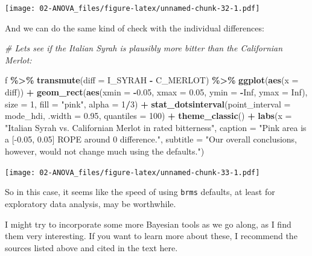 \documentclass[
]{book}
\newenvironment{Shaded}{\begin{snugshade}}{\end{snugshade}}
\newcommand{\AttributeTok}[1]{\textcolor[rgb]{0.13,0.29,0.53}{#1}}
\newcommand{\CommentTok}[1]{\textcolor[rgb]{0.56,0.35,0.01}{\textit{#1}}}
\newcommand{\ConstantTok}[1]{\textcolor[rgb]{0.56,0.35,0.01}{#1}}
\newcommand{\DecValTok}[1]{\textcolor[rgb]{0.00,0.00,0.81}{#1}}
\newcommand{\FloatTok}[1]{\textcolor[rgb]{0.00,0.00,0.81}{#1}}
\newcommand{\FunctionTok}[1]{\textcolor[rgb]{0.13,0.29,0.53}{\textbf{#1}}}
\newcommand{\NormalTok}[1]{#1}
\newcommand{\SpecialCharTok}[1]{\textcolor[rgb]{0.81,0.36,0.00}{\textbf{#1}}}
\newcommand{\StringTok}[1]{\textcolor[rgb]{0.31,0.60,0.02}{#1}}
\begin{document}
\texttt{[image: 02-ANOVA\_files/figure-latex/unnamed-chunk-32-1.pdf]}

And we can do the same kind of check with the individual differences:

\begin{Shaded}
\begin{Highlighting}[]
\CommentTok{\# Let\textquotesingle{}s see if the Italian Syrah is plausibly more bitter than the Californian Merlot:}

\NormalTok{f }\SpecialCharTok{\%\textgreater{}\%}
  \FunctionTok{transmute}\NormalTok{(}\AttributeTok{diff =}\NormalTok{ I\_SYRAH }\SpecialCharTok{{-}}\NormalTok{ C\_MERLOT) }\SpecialCharTok{\%\textgreater{}\%}
  \FunctionTok{ggplot}\NormalTok{(}\FunctionTok{aes}\NormalTok{(}\AttributeTok{x =}\NormalTok{ diff)) }\SpecialCharTok{+} 
  \FunctionTok{geom\_rect}\NormalTok{(}\FunctionTok{aes}\NormalTok{(}\AttributeTok{xmin =} \SpecialCharTok{{-}}\FloatTok{0.05}\NormalTok{, }\AttributeTok{xmax =} \FloatTok{0.05}\NormalTok{,}
                \AttributeTok{ymin =} \SpecialCharTok{{-}}\ConstantTok{Inf}\NormalTok{, }\AttributeTok{ymax =} \ConstantTok{Inf}\NormalTok{), }
            \AttributeTok{size =} \DecValTok{1}\NormalTok{, }\AttributeTok{fill =} \StringTok{"pink"}\NormalTok{, }\AttributeTok{alpha =} \DecValTok{1}\SpecialCharTok{/}\DecValTok{3}\NormalTok{) }\SpecialCharTok{+} 
  \FunctionTok{stat\_dotsinterval}\NormalTok{(}\AttributeTok{point\_interval =}\NormalTok{ mode\_hdi, }\AttributeTok{.width =} \FloatTok{0.95}\NormalTok{, }\AttributeTok{quantiles =} \DecValTok{100}\NormalTok{) }\SpecialCharTok{+} 
  \FunctionTok{theme\_classic}\NormalTok{() }\SpecialCharTok{+}
  \FunctionTok{labs}\NormalTok{(}\AttributeTok{x =} \StringTok{"Italian Syrah vs. Californian Merlot in rated bitterness"}\NormalTok{,}
       \AttributeTok{caption =} \StringTok{"Pink area is a [{-}0.05, 0.05] ROPE around 0 difference."}\NormalTok{,}
       \AttributeTok{subtitle =} \StringTok{"Our overall conclusions, however, would not change much using the defaults."}\NormalTok{)}
\end{Highlighting}
\end{Shaded}

\texttt{[image: 02-ANOVA\_files/figure-latex/unnamed-chunk-33-1.pdf]}

So in this case, it seems like the speed of using \texttt{brms} defaults, at least for exploratory data analysis, may be worthwhile.

I might try to incorporate some more Bayesian tools as we go along, as I find them very interesting. If you want to learn more about these, I recommend the sources listed above and cited in the text here.
\end{document}
